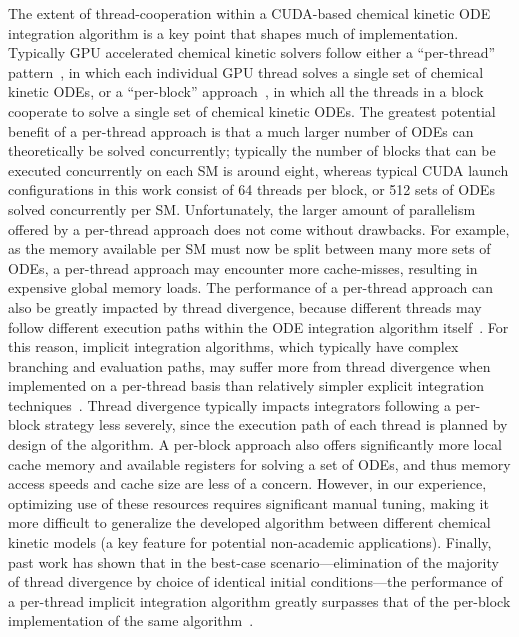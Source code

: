\documentclass[preprint]{elsarticle}
\begin{document}
The extent of thread-cooperation within a CUDA-based chemical kinetic ODE integration algorithm is a key point that shapes much of implementation.
Typically GPU accelerated chemical kinetic solvers follow either a ``per-thread'' pattern~\cite{Niemeyer:2011aa,Stone:2013aa,Niemeyer:2014aa}, in which each individual GPU thread solves a single set of chemical kinetic ODEs, or a ``per-block'' approach~\cite{Stone:2013aa,Sewerin20151375}, in which all the threads in a block cooperate to solve a single set of chemical kinetic ODEs.
The greatest potential benefit of a per-thread approach is that a much larger number of ODEs can theoretically be solved concurrently; typically the number of blocks that can be executed concurrently on each SM is around eight, whereas typical CUDA launch configurations in this work consist of 64 threads per block, or 512 sets of ODEs solved concurrently per SM.
Unfortunately, the larger amount of parallelism offered by a per-thread approach does not come without drawbacks.
For example, as the memory available per SM must now be split between many more sets of ODEs, a per-thread approach may encounter more cache-misses, resulting in expensive global memory loads.
The performance of a per-thread approach can also be greatly impacted by thread divergence, because different threads may follow different execution paths within the ODE integration algorithm itself~\cite{Stone:2013aa,Niemeyer:2014aa}.
For this reason, implicit integration algorithms, which typically have complex branching and evaluation paths, may suffer more from thread divergence when implemented on a per-thread basis than relatively simpler explicit integration techniques~\cite{Stone:2013aa}.
Thread divergence typically impacts integrators following a per-block strategy less severely, since the execution path of each thread is planned by design of the algorithm.
A per-block approach also offers significantly more local cache memory and available registers for solving a set of ODEs, and thus memory access speeds and cache size are less of a concern.
However, in our experience, optimizing use of these resources requires significant manual tuning, making it more difficult to generalize the developed algorithm between different chemical kinetic models (a key feature for potential non-academic applications).
Finally, past work has shown that in the best-case scenario---elimination of the majority of thread divergence by choice of identical initial conditions---the performance of a per-thread implicit integration algorithm greatly surpasses that of the per-block implementation of the same algorithm~\cite{Stone:2013aa}.
\end{document}
